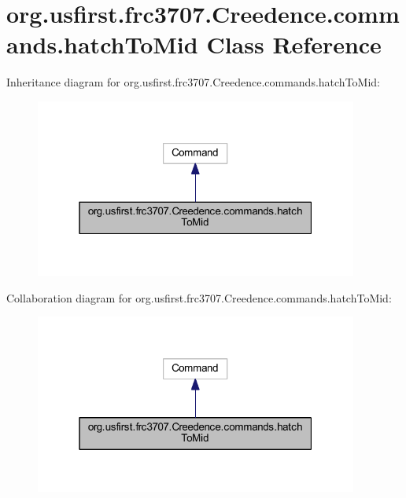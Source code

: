 \hypertarget{classorg_1_1usfirst_1_1frc3707_1_1_creedence_1_1commands_1_1hatch_to_mid}{}\section{org.\+usfirst.\+frc3707.\+Creedence.\+commands.\+hatch\+To\+Mid Class Reference}
\label{classorg_1_1usfirst_1_1frc3707_1_1_creedence_1_1commands_1_1hatch_to_mid}


Inheritance diagram for org.\+usfirst.\+frc3707.\+Creedence.\+commands.\+hatch\+To\+Mid\+:
\nopagebreak
\begin{figure}[H]
\begin{center}
\leavevmode
\includegraphics[width=301pt]{classorg_1_1usfirst_1_1frc3707_1_1_creedence_1_1commands_1_1hatch_to_mid__inherit__graph}
\end{center}
\end{figure}


Collaboration diagram for org.\+usfirst.\+frc3707.\+Creedence.\+commands.\+hatch\+To\+Mid\+:
\nopagebreak
\begin{figure}[H]
\begin{center}
\leavevmode
\includegraphics[width=301pt]{classorg_1_1usfirst_1_1frc3707_1_1_creedence_1_1commands_1_1hatch_to_mid__coll__graph}
\end{center}
\end{figure}
